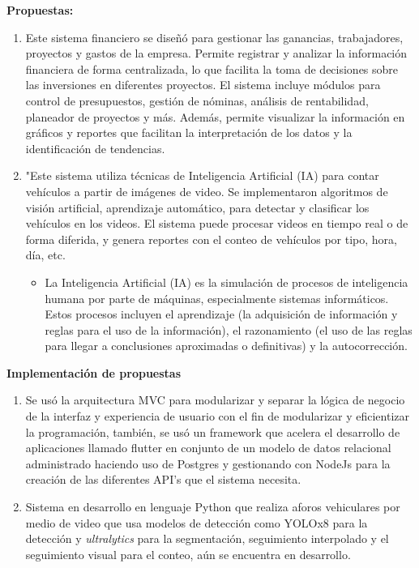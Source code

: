 \documentclass[protocolo.tex]{subfiles}
\begin{document}
\textbf{Propuestas:}
\begin{enumerate}
\item Este sistema financiero se diseñó para gestionar las ganancias,  trabajadores,  proyectos  y  gastos  de  la  empresa.  Permite  registrar  y  analizar  la  información  financiera  de  forma  centralizada,  lo  que  facilita  la  toma  de  decisiones  sobre  las  inversiones  en  diferentes  proyectos.  El  sistema  incluye  módulos  para  control  de  presupuestos,  gestión  de  nóminas,  análisis  de  rentabilidad, planeador de proyectos y más.  Además,  permite  visualizar  la  información  en  gráficos  y  reportes  que  facilitan  la  interpretación  de  los  datos  y  la  identificación  de  tendencias.
\item "Este sistema utiliza técnicas de Inteligencia Artificial (IA) para  contar  vehículos  a  partir  de  imágenes  de  video.  Se  implementaron  algoritmos  de visión  artificial,  aprendizaje  automático, para  detectar  y  clasificar  los  vehículos  en  los  videos.  El  sistema  puede  procesar  videos  en  tiempo  real  o  de  forma  diferida,  y  genera  reportes  con  el  conteo  de  vehículos  por  tipo,  hora,  día,  etc.

\begin{itemize}
    \item La Inteligencia Artificial (IA)  es  la  simulación  de  procesos  de  inteligencia  humana  por  parte  de  máquinas,  especialmente  sistemas  informáticos.  Estos  procesos  incluyen  el  aprendizaje  (la  adquisición  de  información  y  reglas  para  el  uso  de  la  información),  el  razonamiento  (el  uso  de  las  reglas  para  llegar  a  conclusiones  aproximadas  o  definitivas)  y  la  autocorrección. \cite{russell2010}
\end{itemize}

\end{enumerate}

\textbf{Implementación de propuestas}
\begin{enumerate}
\item Se usó la arquitectura MVC para modularizar y separar la lógica de negocio de la interfaz y experiencia de usuario con el fin de modularizar y eficientizar la programación, también, se usó un framework que acelera el desarrollo de aplicaciones llamado flutter en conjunto de un modelo de datos relacional administrado haciendo uso de Postgres y gestionando con NodeJs para la creación de las diferentes API’s que el sistema necesita.
\item Sistema en desarrollo en lenguaje Python que realiza aforos vehiculares por medio de video que usa modelos de detección como YOLOx8 para la detección y \textit{ultralytics} para la segmentación, seguimiento interpolado y el seguimiento visual para el conteo, aún se encuentra en desarrollo.
\end{enumerate}
\end{document}
